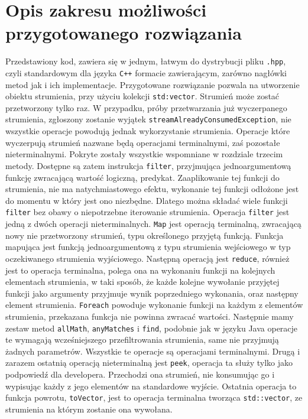 \documentclass[a4paper,10pt]{report}
\begin{document}
\section{Opis zakresu możliwości przygotowanego rozwiązania}
Przedstawiony kod, zawiera się w jednym, łatwym do dystrybucji pliku \verb|.hpp|, czyli standardowym dla języka \verb|C++| formacie zawierającym, zarówno nagłówki metod jak i ich implementacje. Przygotowane rozwiązanie pozwala na utworzenie obiektu strumienia, przy użyciu kolekcji \verb|std:vector|. Strumień może zostać przetworzony tylko raz. W przypadku, próby przetwarzania już wyczerpanego strumienia, zgłoszony zostanie wyjątek \verb|streamAlreadyConsumedException|, nie wszystkie operacje powodują jednak wykorzystanie strumienia. Operacje które wyczerpują strumień nazwane będą operacjami terminalnymi, zaś pozostałe nieterminalnymi. Pokryte zostały wszystkie wspomniane w rozdziale trzecim metody. Dostępne są zatem instrukcja \verb|filter|, przyjmująca jednoargumentową funkcję zwracającą wartość logiczną, predykat. Zaaplikowanie tej funkcji do strumienia, nie ma natychmiastowego efektu, wykonanie tej funkcji odłożone jest do momentu w który jest ono niezbędne. Dlatego można składać wiele funkcji \verb|filter| bez obawy o niepotrzebne iterowanie strumienia. Operacja \verb|filter| jest jedną z dwóch operacji nieterminalnych. \verb|Map| jest operacją terminalną, zwracającą nowy nie przetworzony strumień, typu określonego przyjętą funkcją. Funkcja mapująca jest funkcją jednoargumentową z typu strumienia wejściowego w typ oczekiwanego strumienia wyjściowego. Następną operacją jest \verb|reduce|, również jest to operacja terminalna, polega ona na wykonaniu funkcji na kolejnych elementach strumienia, w taki sposób, że każde kolejne wywołanie przyjętej funkcji jako argumenty przyjmuje wynik poprzedniego wykonania, oraz następny element strumienia. \verb|Foreach| powoduje wykonanie funkcji na każdym z elementów strumienia, przekazana funkcja nie powinna zwracać wartości. Następnie mamy zestaw metod \verb|allMath|, \verb|anyMatches| i \verb|find|, podobnie jak w języku Java operacje te wymagają wcześniejszego przefiltrowania strumienia, same nie przyjmują żadnych parametrów. Wszystkie te operacje są operacjami terminalnymi. Drugą i zarazem ostatnią operacją nieterminalną jest \verb|peek|, operacja ta służy tylko jako podpowiedź dla developera. Przechodzi ona strumień, nie konsumując go i wypisując każdy z jego elementów na standardowe wyjście. Ostatnia operacja to funkcja powrotu, \verb|toVector|, jest to operacja terminalna tworząca \verb|std::vector|, ze strumienia na którym zostanie ona wywołana.
\end{document}
